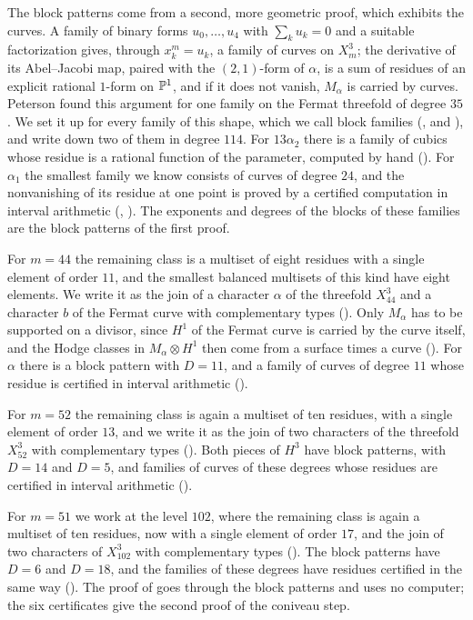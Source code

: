 The block patterns come from a second, more geometric proof, which exhibits
the curves. A family of binary forms $u_{0},\dots,u_{4}$ with $\sum_{k}u_{k}
=0$ and a suitable factorization gives, through $x_{k}^{m}=u_{k}$, a family
of curves on $X^{3}_{m}$; the derivative of its Abel--Jacobi map, paired
with the $(2,1)$-form of $\alpha$, is a sum of residues of an explicit
rational $1$-form on $\mathbb{P}^{1}$, and if it does not vanish, $M_{\alpha}$ is
carried by curves. Peterson found this argument for one family on the Fermat
threefold of degree $35$ \cite[\S3]{Pet26}. We set it up for every family
of this shape, which we call block families (,
 and ), and write down two of them
in degree $114$. For $13\alpha_{2}$ there is a family of cubics whose
residue is a rational function of the parameter, computed by hand
(). For $\alpha_{1}$ the smallest family we know consists
of curves of degree $24$, and the nonvanishing of its residue at one point
is proved by a certified computation in interval arithmetic
(, ). The exponents and degrees of
the blocks of these families are the block patterns of the first proof.

For $m=44$ the remaining class is a multiset of eight residues with a
single element of order $11$, and the smallest balanced multisets of this
kind have eight elements. We write it as the join of a character $\alpha$
of the threefold $X^{3}_{44}$ and a character $b$ of the Fermat curve with
complementary types (). Only $M_{\alpha}$ has to be
supported on a divisor, since $H^{1}$ of the Fermat curve is carried by the
curve itself, and the Hodge classes in $M_{\alpha}\otimes H^{1}$ then come
from a surface times a curve (). For $\alpha$ there
is a block pattern with $D=11$, and a family of curves of degree $11$ whose
residue is certified in interval arithmetic ().

For $m=52$ the remaining class is again a multiset of ten residues, with a
single element of order $13$, and we write it as the join of two characters
of the threefold $X^{3}_{52}$ with complementary types ().
Both pieces of $H^{3}$ have block patterns, with $D=14$ and $D=5$, and
families of curves of these degrees whose residues are certified in interval
arithmetic ().

For $m=51$ we work at the level $102$, where the remaining class is again a
multiset of ten residues, now with a single element of order $17$, and the
join of two characters of $X^{3}_{102}$ with complementary types
(). The block patterns have $D=6$ and $D=18$, and the
families of these degrees have residues certified in the same way
(). The proof of 
goes through the block patterns and uses no computer; the six certificates
give the second proof of the coniveau step.

